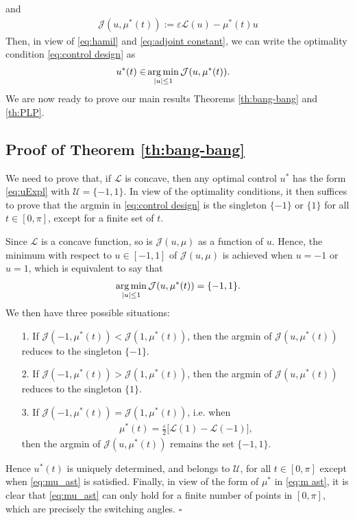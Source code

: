 \documentclass[twocolumn]{autart}    %
\begin{document}
and
\begin{align}\label{eq:functionalJ}
	\mathcal{J} (u,\mu^\ast(t)):= \varepsilon \mathcal{L}(u) - \mu^\ast(t) u 
\end{align}    
Then, in view of \eqref{eq:hamil} and \eqref{eq:adjoint constant}, we can write the optimality condition \eqref{eq:control design} as
\begin{align}\label{eq:control design2}
    u^\ast(t)  \in & \operatorname*{arg\,min}_{|u|\leq 1}  \mathcal{J} (u,\mu^\ast(t)).  
\end{align}    
We are now ready to prove our main results Theorems \ref{th:bang-bang} and \ref{th:PLP}.

\subsection{Proof of Theorem \ref{th:bang-bang}}\label{proof:bang-bang}

We need to prove that, if $\mathcal{L}$ is concave, then any optimal control $u^\ast$ has the form \eqref{eq:uExpl} with $\mathcal{U}=\{-1,1\}$. In view of the optimality conditions, it then suffices to prove that the argmin in \eqref{eq:control design} is the singleton $\{-1\}$ or $\{1\}$ for all $t\in [0,\pi]$, except for a finite set of $t$.

Since $\mathcal{L}$ is a concave function, so is $\mathcal{J}(u,\mu)$ as a function of $u$. Hence, the minimum with respect to $u\in[-1,1]$ of $\mathcal{J}(u,\mu)$ is achieved when $u=-1$ or $u=1$, which is equivalent to say that 
\begin{align*}
	\operatorname*{arg\,min}_{|u|\leq 1}  \mathcal{J} (u,\mu^\ast(t)) = \{-1,1\}.
\end{align*}
We then have three possible situations:
\begin{itemize}
	\item[1.] If $\mathcal{J}(-1,\mu^\ast(t)) <  \mathcal{J}(1,\mu^\ast(t))$, then the argmin of $\mathcal{J} (u,\mu^\ast(t))$ reduces to the singleton $\{-1\}$.
	\vspace{0.2cm}
	\item[2.] If $\mathcal{J}(-1,\mu^\ast(t)) >  \mathcal{J}(1,\mu^\ast(t))$, then the argmin of $\mathcal{J} (u,\mu^\ast(t))$ reduces to the singleton $\{1\}$.
	\vspace{0.2cm}
	\item[3.] If $\mathcal{J}(-1,\mu^\ast(t)) =  \mathcal{J}(1,\mu^\ast(t))$, i.e. when 
	\begin{align}\label{eq:mu_ast}
		\mu^\ast (t) = \frac{\varepsilon}{2} \Big[\mathcal{L}(1) - \mathcal{L}(-1)\Big],
	\end{align}
	then the argmin of $\mathcal{J} (u,\mu^\ast(t))$ remains the set $\{-1,1\}$.
\end{itemize}
Hence $u^\ast(t)$ is uniquely determined, and belongs to $\mathcal{U}$, for all $t\in [0,\pi]$ except when \eqref{eq:mu_ast} is satisfied. Finally, in view of the form of $\mu^\ast$ in \eqref{eq:m ast}, it is clear that \eqref{eq:mu_ast} can only hold for a finite number of points in $[0,\pi]$, which are precisely the switching angles. \hfill $\square$
\end{document}

